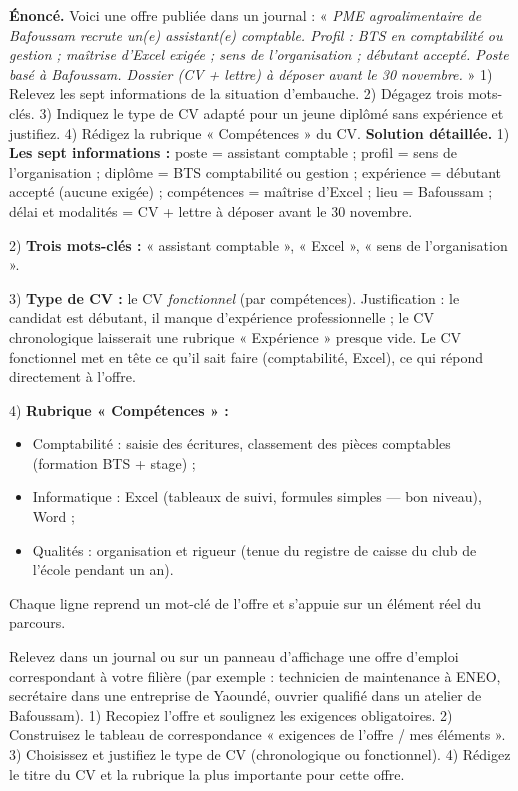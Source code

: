 \documentclass[11pt]{article}
\begin{document}
\begin{exoresolu}
\textbf{Énoncé.} Voici une offre publiée dans un journal : « \emph{PME agroalimentaire de Bafoussam recrute un(e) assistant(e) comptable. Profil : BTS en comptabilité ou gestion ; maîtrise d'Excel exigée ; sens de l'organisation ; débutant accepté. Poste basé à Bafoussam. Dossier (CV + lettre) à déposer avant le 30 novembre.} »
1) Relevez les sept informations de la situation d'embauche. 2) Dégagez trois mots-clés. 3) Indiquez le type de CV adapté pour un jeune diplômé sans expérience et justifiez. 4) Rédigez la rubrique « Compétences » du CV.
\tcblower
\textbf{Solution détaillée.}
1) \textbf{Les sept informations :} poste = assistant comptable ; profil = sens de l'organisation ; diplôme = BTS comptabilité ou gestion ; expérience = débutant accepté (aucune exigée) ; compétences = maîtrise d'Excel ; lieu = Bafoussam ; délai et modalités = CV + lettre à déposer avant le 30 novembre.

2) \textbf{Trois mots-clés :} « assistant comptable », « Excel », « sens de l'organisation ».

3) \textbf{Type de CV :} le CV \emph{fonctionnel} (par compétences). Justification : le candidat est débutant, il manque d'expérience professionnelle ; le CV chronologique laisserait une rubrique « Expérience » presque vide. Le CV fonctionnel met en tête ce qu'il sait faire (comptabilité, Excel), ce qui répond directement à l'offre.

4) \textbf{Rubrique « Compétences » :}
\begin{itemize}
\item Comptabilité : saisie des écritures, classement des pièces comptables (formation BTS + stage) ;
\item Informatique : Excel (tableaux de suivi, formules simples — bon niveau), Word ;
\item Qualités : organisation et rigueur (tenue du registre de caisse du club de l'école pendant un an).
\end{itemize}
Chaque ligne reprend un mot-clé de l'offre et s'appuie sur un élément réel du parcours.
\end{exoresolu}

\begin{exercice}
Relevez dans un journal ou sur un panneau d'affichage une offre d'emploi correspondant à votre filière (par exemple : technicien de maintenance à ENEO, secrétaire dans une entreprise de Yaoundé, ouvrier qualifié dans un atelier de Bafoussam).
1) Recopiez l'offre et soulignez les exigences obligatoires.
2) Construisez le tableau de correspondance « exigences de l'offre / mes éléments ».
3) Choisissez et justifiez le type de CV (chronologique ou fonctionnel).
4) Rédigez le titre du CV et la rubrique la plus importante pour cette offre.
\end{exercice}
\end{document}
